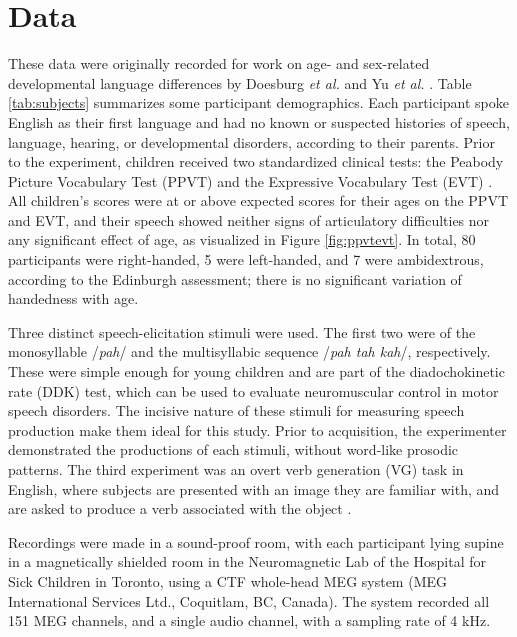 \documentclass[utf8]{frontiersSCNS} %
\begin{document}
\section{Data}

These data were originally recorded for work on age- and sex-related developmental language differences by Doesburg \emph{et al.} and Yu \emph{et al.} \cite{Doesburg2016, Yu2014}. Table \ref{tab:subjects} summarizes some participant demographics. Each participant spoke English as their first language and had no known or suspected histories of speech, language, hearing, or developmental disorders, according to their parents. Prior to the experiment, children received two standardized clinical tests: the Peabody Picture Vocabulary Test (PPVT) \cite{Dunn97} and the Expressive Vocabulary Test (EVT) \cite{EVT}. All children's scores were at or above expected scores for their ages on the PPVT and EVT, and their speech showed neither signs of articulatory difficulties nor any significant effect of age, as visualized in Figure \ref{fig:ppvtevt}. In total, 80 participants were right-handed, 5 were left-handed, and 7 were ambidextrous, according to the Edinburgh assessment; there is no significant variation of handedness with age.


Three distinct speech-elicitation stimuli were used. The first two were of the monosyllable /{\em pah}/ and the multisyllabic sequence /{\em pah tah kah}/, respectively. These were simple enough for young children and are part of the diadochokinetic rate (DDK) test, which can be used to evaluate neuromuscular control in motor speech disorders. The incisive nature of these stimuli for measuring speech production make them ideal for this study. Prior to acquisition, the experimenter demonstrated the productions of each stimuli, without word-like prosodic patterns. The third experiment was an overt verb generation (VG) task in English, where subjects are presented with an image they are familiar with, and are asked to produce a verb associated with the object \cite{Doesburg2016}.

Recordings were made in a sound-proof room, with each participant lying supine in a magnetically shielded room in the Neuromagnetic Lab of the Hospital for Sick Children in Toronto, using a CTF whole-head MEG system (MEG International Services Ltd., Coquitlam, BC, Canada). The system recorded all 151 MEG channels, and a single audio channel, with a sampling rate of 4 kHz.
\end{document}

